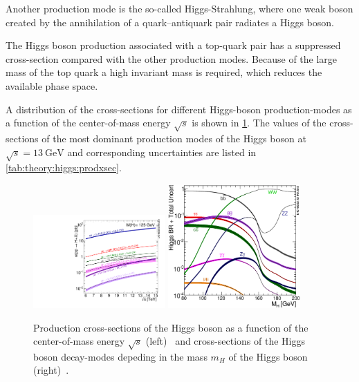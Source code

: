 Another production mode is the so-called Higgs-Strahlung, where one weak boson created by the annihilation of
a quark--antiquark pair radiates a Higgs boson.

The Higgs boson production associated with a top-quark pair has a suppressed cross-section compared with the
other production modes.
Because of the large mass of the top quark a high invariant mass is required, which reduces the available phase space.

A distribution of the cross-sections for different Higgs-boson production-modes as a function of the center-of-mass
energy $\sqrt{s}$ is shown in \cref{fig:theory:higgs:xsecs}.
The values of the cross-sections of the most dominant production modes of the Higgs boson at $\sqrt{s} = \SI{13}{\GeV}$
and corresponding uncertainties are listed in \cref{tab:theory:higgs:prodxsec}.

\begin{figure}[htb]
    \centering
    \includegraphics[width=0.45\textwidth]{./figures/theory/higgs_xsec_production.pdf}
    \includegraphics[width=0.45\textwidth]{./figures/theory/higgs_xsec_decay.eps}
    \caption{Production cross-sections of the Higgs boson as a function of the center-of-mass energy $\sqrt{s}$ (left)~\cite{YR4}
             and cross-sections of the Higgs boson decay-modes depeding in the mass $m_H$ of the Higgs boson (right)~\cite{YR3}.}\label{fig:theory:higgs:xsecs}
\end{figure}

